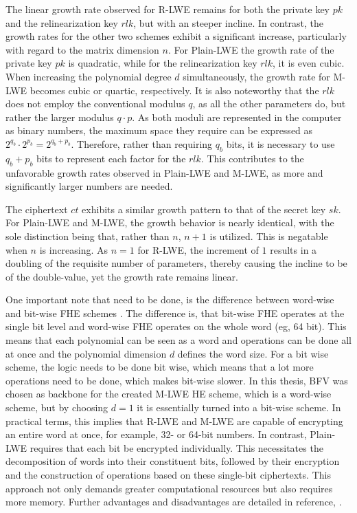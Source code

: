 The linear growth rate observed for R-LWE remains for both the private key $pk$ and the relinearization key $rlk$, but with an steeper incline. In contrast, the growth rates for the other two schemes exhibit a significant increase, particularly with regard to the matrix dimension $n$. For Plain-LWE the growth rate of the private key $pk$ is quadratic, while for the relinearization key $rlk$, it is even cubic. When increasing the polynomial degree $d$ simultaneously, the growth rate for M-LWE becomes cubic or quartic, respectively. It is also noteworthy that the $rlk$ does not employ the conventional modulus $q$, as all the other parameters do, but rather the larger modulus $q\cdot p$. As both moduli are represented in the computer as binary numbers, the maximum space they require can be expressed as $2^{q_b}\cdot 2^{p_b} = 2^{q_b+p_b}$. Therefore, rather than requiring $q_b$ bits, it is necessary to use $q_b+p_b$ bits to represent each factor for the $rlk$. This contributes to the unfavorable growth rates observed in Plain-LWE and M-LWE, as more and significantly larger numbers are needed.

The ciphertext $ct$ exhibits a similar growth pattern to that of the secret key $sk$. For Plain-LWE and M-LWE, the growth behavior is nearly identical, with the sole distinction being that, rather than $n$, $n+1$ is utilized. This is negatable when $n$ is increasing. As $n=1$ for R-LWE, the increment of $1$ results in a doubling of the requisite number of parameters, thereby causing the incline to be of the double-value, yet the growth rate remains linear.

One important note that need to be done, is the difference between word-wise and bit-wise FHE schemes \cite{WordBitWiseFhe}. The difference is, that bit-wise FHE operates at the single bit level and word-wise FHE operates on the whole word (eg, 64 bit). This means that each polynomial can be seen as a word and operations can be done all at once and the polynomial dimension $d$ defines the word size. For a bit wise scheme, the logic needs to be done bit wise, which means that a lot more operations need to be done, which makes bit-wise slower. In this thesis, BFV was chosen as backbone for the created M-LWE HE scheme, which is a word-wise scheme, but by choosing $d=1$ it is essentially turned into a bit-wise scheme. In practical terms, this implies that R-LWE and M-LWE are capable of encrypting an entire word at once, for example, 32- or 64-bit numbers. In contrast, Plain-LWE requires that each bit be encrypted individually. This necessitates the decomposition of words into their constituent bits, followed by their encryption and the construction of operations based on these single-bit ciphertexts. This approach not only demands greater computational resources but also requires more memory. Further advantages and disadvantages are detailed in reference, \cite{WordBitWiseFhe}. 

